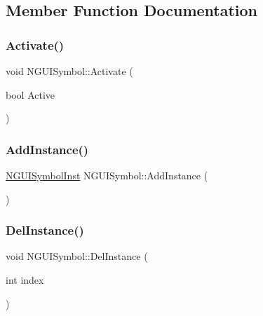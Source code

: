 \subsection{Member Function Documentation}
\hypertarget{class_n_g_u_i_symbol_af399bf0f4ecee8cc2af20e87504f5951}{}\label{class_n_g_u_i_symbol_af399bf0f4ecee8cc2af20e87504f5951} 
\subsubsection{\texorpdfstring{Activate()}{Activate()}}
{\footnotesize\ttfamily void N\+G\+U\+I\+Symbol\+::\+Activate (\begin{DoxyParamCaption}\item[{bool}]{Active }\end{DoxyParamCaption})}

\hypertarget{class_n_g_u_i_symbol_acffeab9c4987a13d57133a089d1b8fea}{}\label{class_n_g_u_i_symbol_acffeab9c4987a13d57133a089d1b8fea} 
\subsubsection{\texorpdfstring{Add\+Instance()}{AddInstance()}}
{\footnotesize\ttfamily \hyperlink{class_n_g_u_i_symbol_inst}{N\+G\+U\+I\+Symbol\+Inst} N\+G\+U\+I\+Symbol\+::\+Add\+Instance (\begin{DoxyParamCaption}{ }\end{DoxyParamCaption})}

\hypertarget{class_n_g_u_i_symbol_ac89e99b7d6f51e9e3aa517f39b39e209}{}\label{class_n_g_u_i_symbol_ac89e99b7d6f51e9e3aa517f39b39e209} 
\subsubsection{\texorpdfstring{Del\+Instance()}{DelInstance()}}
{\footnotesize\ttfamily void N\+G\+U\+I\+Symbol\+::\+Del\+Instance (\begin{DoxyParamCaption}\item[{int}]{index }\end{DoxyParamCaption})}

